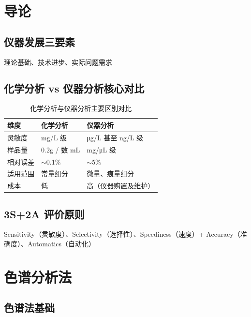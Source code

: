 \documentclass[11pt,a4paper]{article}
\begin{document}
\section{导论}

\subsection{仪器发展三要素}
理论基础、技术进步、实际问题需求

\subsection{化学分析 vs 仪器分析核心对比}
\begin{table}[htbp]
\centering
\small
\begin{tabular}{>{\raggedright\arraybackslash}p{3.8cm} 
                >{\raggedright\arraybackslash}p{3.2cm} 
                >{\raggedright\arraybackslash}p{4.2cm}}
\toprule
\rowcolor{sectionColor!30}\textbf{维度} & \textbf{化学分析} & \textbf{仪器分析} \\
\midrule
\rowcolor{tableRowOdd}灵敏度 & mg/L 级 & μg/L 甚至 ng/L 级 \\
\rowcolor{tableRowEven}样品量 & 0.2g / 数 mL & mg/μL 级 \\
\rowcolor{tableRowOdd}相对误差 & $\sim$0.1\% & $\sim$5\% \\
\rowcolor{tableRowEven}适用范围 & 常量组分 & 微量、痕量组分 \\
\rowcolor{tableRowOdd}成本 & 低 & 高（仪器购置及维护） \\
\bottomrule
\end{tabular}
\caption{化学分析与仪器分析主要区别对比}
\end{table}

\subsection{3S+2A 评价原则}
Sensitivity（灵敏度）、Selectivity（选择性）、Speediness（速度）+ Accuracy（准确度）、Automatics（自动化）


\newpage
\section{色谱分析法}

\subsection{色谱法基础}
\end{document}
